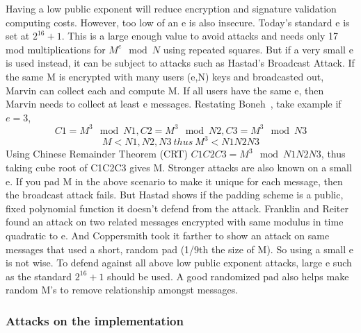 \documentclass[12pt,journal,compsoc]{IEEEtran}
\begin{document}
Having a low public exponent will reduce encryption and signature
validation computing costs.  However, too low of an e is also
insecure.  Today’s standard e is set at $2^{16} + 1$.   This is a large
enough value to avoid attacks and needs only 17 mod multiplications
for $M^{e} \mod N$ using repeated squares. But if a very small e is used
instead, it can be subject to attacks such as Hastad’s Broadcast
Attack.  If the same M is encrypted with many users (e,N) keys and
broadcasted out, Marvin can collect each and compute M.  If all users
have the same e, then Marvin needs to collect at least e messages.
Restating Boneh~\cite{boneh1999twenty}, take example if $e=3$,
\begin{equation}
  \label{eq:low-public-expo-1}
  C1 = M^{3} \mod N1, C2 = M^{3} \mod N2,
  C3 = M^{3} \mod N3
\end{equation}
\begin{equation}
  \label{eq:low-public-expo-2}
  M < {N1, N2, N3}~thus~M^{3} < N1N2N3
\end{equation}
Using Chinese Remainder Theorem (CRT) $C1C2C3 = M^{3} \mod N1N2N3$, thus
taking cube root of C1C2C3 gives M. Stronger attacks are also known on
a small e.  If you pad M in the above scenario to make it unique for
each message, then the broadcast attack fails.  But Hastad shows if
the padding scheme is a public, fixed polynomial function it doesn’t
defend from the attack.  Franklin and Reiter found an attack on two
related messages encrypted with same modulus in time quadratic to
e. And Coppersmith took it farther to show an attack on same messages
that used a short, random pad (1/9th the size of M).  So using a small
e is not wise. To defend against all above low public exponent
attacks, large e such as the standard $2^{16} + 1$ should be used.  A
good randomized pad also helps make random M’s to remove relationship
amongst messages. 

\subsubsection{\qquad Attacks on the implementation}
\label{sec:qquad-attacks-impl}
\end{document}
